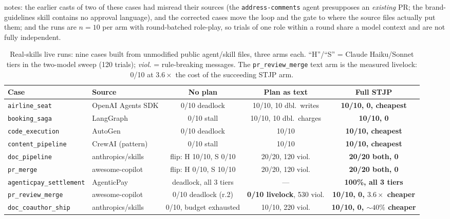 \documentclass{article}
\newcommand{\stjp}{\textsc{STJP}}
\begin{document}
notes: the earlier casts of two of these cases had misread their sources (the \texttt{address-comments} agent presupposes an \emph{existing} PR; the brand-guidelines skill contains no approval language), and the corrected cases move the loop and the gate to where the source files actually put them; and the runs are $n{=}10$ per arm with round-batched role-play, so trials of one role within a round share a model context and are not fully independent.

\begin{table}[t]
\centering\footnotesize
\caption{Real-skills live runs: nine cases built from unmodified public agent/skill files, three arms each. ``H''/``S'' = Claude Haiku/Sonnet tiers in the two-model sweep (120 trials); \emph{viol.} = rule-breaking messages. The \texttt{pr\_review\_merge} text arm is the measured livelock: 0/10 at $3.6\times$ the cost of the succeeding \stjp{} arm.}
\label{tab:realcases}
\begin{tabular}{@{}llccc@{}}
\toprule
\textbf{Case} & \textbf{Source} & \textbf{No plan} & \textbf{Plan as text} & \textbf{Full \stjp{}} \\
\midrule
\texttt{airline\_seat} & OpenAI Agents SDK & 0/10 deadlock & 10/10, 10 dbl.\ writes & \textbf{10/10, 0, cheapest} \\
\texttt{booking\_saga} & LangGraph & 0/10 stall & 10/10, 10 dbl.\ charges & \textbf{10/10, 0} \\
\texttt{code\_execution} & AutoGen & 0/10 deadlock & 10/10 & \textbf{10/10, cheapest} \\
\texttt{content\_pipeline} & CrewAI (pattern) & 0/10 stall & 10/10 & \textbf{10/10, cheapest} \\
\texttt{doc\_pipeline} & anthropics/skills & flip: H 10/10, S 0/10 & 20/20, 120 viol. & \textbf{20/20 both, 0} \\
\texttt{pr\_merge} & awesome-copilot & flip: H 0/10, S 10/10 & 20/20, 120 viol. & \textbf{20/20 both, 0} \\
\texttt{agenticpay\_settlement} & AgenticPay & deadlock, all 3 tiers & --- & \textbf{100\%, all 3 tiers} \\
\texttt{pr\_review\_merge} & awesome-copilot & 0/10 deadlock (r.2) & \textbf{0/10 livelock}, 530 viol. & \textbf{10/10, 0, $3.6\times$ cheaper} \\
\texttt{doc\_coauthor\_ship} & anthropics/skills & 0/10, budget exhausted & 10/10, 220 viol. & \textbf{10/10, 0, ${\sim}40\%$ cheaper} \\
\bottomrule
\end{tabular}
\end{table}
\end{document}
